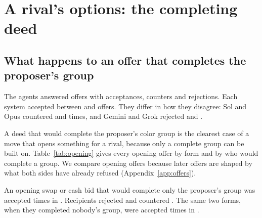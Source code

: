 \section{A rival's options: the completing deed}
\label{sec:rival}

\subsection{What happens to an offer that completes the proposer's group}
The agents answered  offers with  acceptances,  counters and  rejections. Each system accepted between  and  offers. They differ in how they disagree: Sol and Opus countered  and  times, and Gemini and Grok rejected  and .

A deed that would complete the proposer's color group is the clearest case of a move that opens something for a rival, because only a complete group can be built on. Table~\ref{tab:opening} gives every opening offer by form and by who would complete a group. We compare opening offers because later offers are shaped by what both sides have already refused (Appendix~\ref{app:offers}).

\begin{table}[t]\centering\small
\TableOpening
\caption{All  acceptance-legal opening offers. A swap moves deeds both ways. A cash bid offers only cash for deeds. A sale offer offers only deeds for cash. ``Other'' holds the remaining forms. Completion is evaluated on ownership after the proposed transfer. Empty cells are omitted: a cash bid cannot complete the recipient's group and a sale offer cannot complete the proposer's.}
\label{tab:opening}\end{table}

An opening swap or cash bid that would complete only the proposer's group was accepted  times in . Recipients rejected  and countered . The same two forms, when they completed nobody's group, were accepted  times in .

